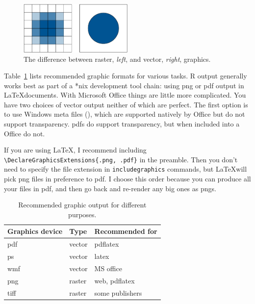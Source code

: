 \begin{figure}[htbp]
  \centering
    \includegraphics[width= 0.5\textwidth]{vector-raster}
  \caption{The difference between raster, {\it left}, and vector, {\it right}, graphics. }
  \label{fig:vector-raster}
\end{figure}

Table~\ref{tbl:graphic-recommendation} lists recommended graphic formats for various tasks.  R output generally works best as part of a *nix development tool chain: using png or pdf output in \LaTeX documents.  With Microsoft Office things are little more complicated.  You have two choices of vector output neither of which are perfect.  The first option is to use Windows meta files (), which are supported natively by Office but do not support transparency.  {\sc pdf}s do support transparency, but when included into a Office do not.

If you are using \LaTeX, I recommend including \verb|\DeclareGraphicsExtensions{.png, .pdf}| in the preamble.  Then you don't need to specify the file extension in \verb|includegraphics| commands, but \LaTeX will pick png files in preference to pdf.  I choose this order because you can produce all your files in pdf, and then go back and re-render any big ones as pngs.

\begin{table}
  \begin{center}
  \begin{tabular}{lll}
    \toprule
    Graphics device & Type & Recommended for \\
    \midrule
    pdf   & vector & pdflatex\\
    ps    & vector & latex \\
    wmf   & vector & MS office \\
    png   & raster & web, pdflatex \\
    tiff  & raster & some publishers \\
    \bottomrule 
  \end{tabular}
  \end{center}
  \caption{Recommended graphic output for different purposes.}
  \label{tbl:graphic-recommendation}
\end{table}


